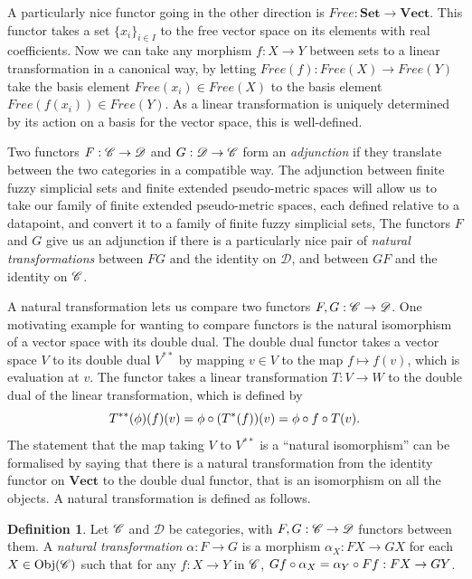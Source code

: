 \documentclass[a4paper,11pt,leqno]{article} \usepackage{amsmath}
\newcommand{\curD}{\mathscr{D}} \newcommand{\curI}{\mathscr{I}}
\newcommand{\Obj}{\ensuremath{\operatorname{Obj}}}
\theoremstyle{definition}
\newtheorem{defn}{Definition}
\begin{document}
A particularly nice functor going in the other direction is $Free:
\textbf{Set}\to \textbf{Vect}$.
This functor takes a set $\{x_i\}_{i\in I}$ to the free vector space on its
elements with real coefficients.
Now we can take any morphism $f: X\to Y$ between sets to a linear
transformation in a canonical way, by letting $Free(f): Free(X)\to Free(Y)$
take the basis element $Free(x_i)\in Free(X)$ to the basis element
$Free(f(x_i))\in Free(Y)$.
As a linear transformation is uniquely determined by its action on a basis for
the vector space, this is well-defined.

Two functors $F: \curC\to\curD$ and $G: \curD\to\curC$ form an
\emph{adjunction} if they translate between the two categories in a compatible
way.
The adjunction between finite fuzzy simplicial sets and finite extended
pseudo-metric spaces will allow us to take our family of finite extended
pseudo-metric spaces, each defined relative to a datapoint, and convert it to
a family of finite fuzzy simplicial sets, 
The functors $F$ and $G$ give us an adjunction if there is a particularly nice
pair of \emph{natural transformations} between $FG$ and the identity on
$\curD$, and between $GF$ and the identity on $\mathscr{C}$.

A natural transformation lets us compare two functors $F, G:
\curC\to\curD$.
One motivating example for wanting to compare functors is the natural
isomorphism of a vector space with its double dual.
The double dual functor takes a vector space $V$ to its double dual $V^{**}$ by
mapping $v\in V$ to the map $f\mapsto f(v)$, which is evaluation at $v$.
The functor takes a linear transformation $T: V\to W$ to the double dual of the
linear transformation, which is defined by
$$T^{**}(\phi)(f)(v) = \phi\circ (T^*(f))(v) = \phi\circ f\circ T(v).$$
The statement that the map taking $V$ to $V^{**}$ is a ``natural isomorphism'' can
be formalised by saying that there is a natural transformation from
the identity functor on $\textbf{Vect}$ to the double dual functor, that is an
isomorphism on all the objects.
A natural transformation is defined as follows.

\begin{defn}
  Let $\mathscr{C}$ and $\curD$ be categories, with $F, G: \curC\to \curD$ functors
  between them.
  A \emph{natural transformation} $\alpha: F\to G$ is a morphism
  $\alpha_X: FX\to GX$ for each $X\in \Obj(\curC)$ such that for any
  $f: X\to Y$ in $\mathscr{C}$, $Gf\circ \alpha_X = \alpha_Y\circ Ff: FX\to GY$.
\end{defn}
\end{document}
